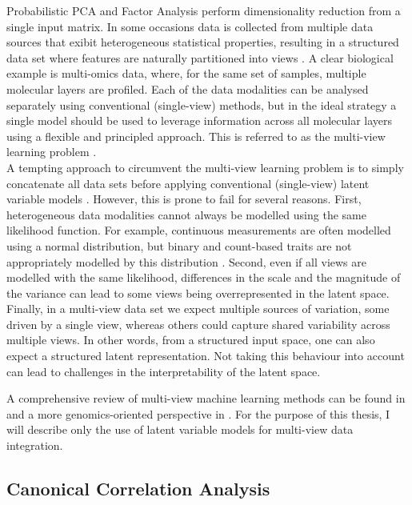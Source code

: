 Probabilistic PCA and Factor Analysis perform dimensionality reduction from a single input matrix. In some occasions data is collected from multiple data sources that exibit heterogeneous statistical properties, resulting in a structured data set where features are naturally partitioned into views \cite{Xu2013,Li2016,Zeng2018}. A clear biological example is multi-omics data, where, for the same set of samples, multiple molecular layers are profiled. Each of the data modalities can be analysed separately using conventional (single-view) methods, but in the ideal strategy a single model should be used to leverage information across all molecular layers using a flexible and principled approach. This is referred to as the multi-view learning problem \cite{Xu2013,Li2016}.\\
A tempting approach to circumvent the multi-view learning problem is to simply concatenate all data sets before applying conventional (single-view) latent variable models \cite{Ritchie2015}. However, this is prone to fail for several reasons. First, heterogeneous data modalities cannot always be modelled using the same likelihood function. For example, continuous measurements are often modelled using a normal distribution, but binary and count-based traits are not appropriately modelled by this distribution \cite{Pilling2018}. Second, even if all views are modelled with the same likelihood, differences in the scale and the magnitude of the variance can lead to some views being overrepresented in the latent space. Finally, in a multi-view data set we expect multiple sources of variation, some driven by a single view, whereas others could capture shared variability across multiple views. In other words, from a structured input space, one can also expect a structured latent representation. Not taking this behaviour into account can lead to challenges in the interpretability of the latent space.

A comprehensive review of multi-view machine learning methods can be found in \cite{Xu2013} and a more genomics-oriented perspective in \cite{Ritchie2015}. For the purpose of this thesis, I will describe only the use of latent variable models for multi-view data integration.

\subsection{Canonical Correlation Analysis} \label{cca}

